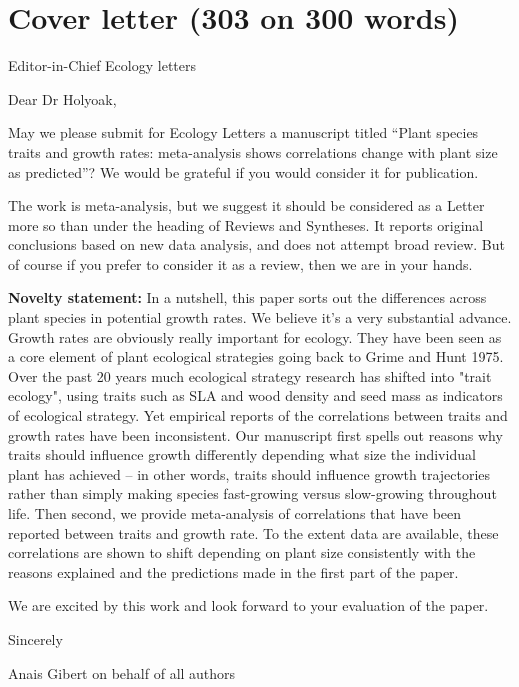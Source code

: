 \documentclass[a4paper]{article}\usepackage[]{graphicx}\usepackage[]{color}
\begin{document}
\section*{Cover letter (303 on 300 words)}\label{Proposal}

Editor-in-Chief Ecology letters


Dear Dr Holyoak,




May we please submit for Ecology Letters a manuscript titled “Plant species traits and growth rates: meta-analysis shows correlations change with plant size as predicted”? We would be grateful if you would consider it for publication.

The work is meta-analysis, but we suggest it should be considered as a Letter more so than under the heading of Reviews and Syntheses. It reports original conclusions based on new data analysis, and does not attempt broad review. But of course if you prefer to consider it as a review, then we are in your hands.


\textbf{Novelty statement:}
In a nutshell, this paper sorts out the differences across plant species in potential growth rates. We believe it's a very substantial advance. Growth rates are obviously really important for ecology. They have been seen as a core element of plant ecological strategies going back to Grime and Hunt 1975. Over the past 20 years much ecological strategy research has shifted into "trait ecology", using traits such as SLA and wood density and seed mass as indicators of ecological strategy. Yet empirical reports of the correlations between traits and growth rates have been inconsistent. Our manuscript first spells out reasons why traits should influence growth differently depending what size the individual plant has achieved -- in other words, traits should influence growth trajectories rather than simply making species fast-growing versus slow-growing throughout life. Then second, we provide meta-analysis of correlations that have been reported between traits and growth rate. To the extent data are available, these correlations are shown to shift depending on plant size consistently with the reasons explained and the predictions made in the first part of the paper.

We are excited by this work and look forward to your evaluation of the paper.



Sincerely

Anais Gibert on behalf of all authors
\end{document}
